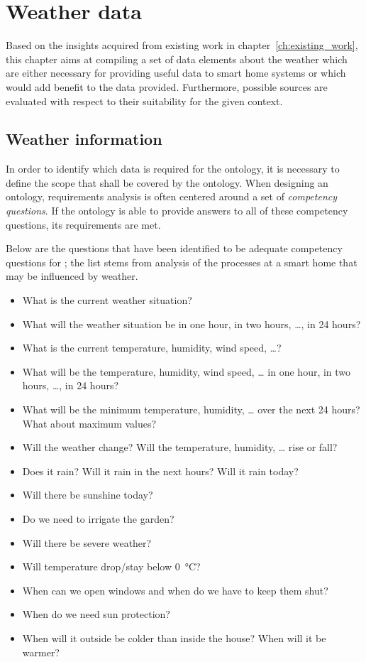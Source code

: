 \chapter{Weather data}
\label{ch:weather_data}

Based on the insights acquired from existing work in chapter~\ref{ch:existing_work}, this chapter aims at compiling a set of data elements about the weather which are either necessary for providing useful data to smart home systems or which would add benefit to the data provided. Furthermore, possible sources are evaluated with respect to their suitability for the given context.

\section{Weather information}
\label{sec:weather_information}

In order to identify which data is required for the \smarthomeweather ontology, it is necessary to define the scope that shall be covered by the ontology. When designing an ontology, requirements analysis is often centered around a set of \emph{competency questions}\cite{Ontology101,UscholdKing,GruningerFox,Methontology}. If the ontology is able to provide answers to all of these competency questions, its requirements are met.

Below are the questions that have been identified to be adequate competency questions for \smarthomeweather; the list stems from analysis of the processes at a smart home that may be influenced by weather.

\begin{itemize}
  \item What is the current weather situation?
  \item What will the weather situation be in one hour, in two hours, …, in 24 hours?
  \item What is the current temperature, humidity, wind speed, …?
  \item What will be the temperature, humidity, wind speed, … in one hour, in two hours, …, in 24 hours?
  \item What will be the minimum temperature, humidity, … over the next 24 hours? What about maximum values?
  \item Will the weather change? Will the temperature, humidity, … rise or fall?
  \item Does it rain? Will it rain in the next hours? Will it rain today?
  \item Will there be sunshine today? 
  \item Do we need to irrigate the garden?
  \item Will there be severe weather?
  \item Will temperature drop/stay below \SI{0}{\celsius}?
  \item When can we open windows and when do we have to keep them shut?
  \item When do we need sun protection?
  \item When will it outside be colder than inside the house? When will it be warmer?
\end{itemize}

